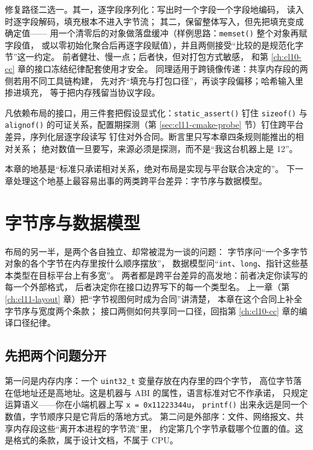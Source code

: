 \documentclass[12pt,a4paper,fontset=fandol]{ctexbook}
\newcommand{\Fn}[1]{\texttt{#1()}}
\newcommand{\Tp}[1]{\texttt{#1}}
\begin{document}
修复路径二选一。其一，逐字段序列化：写出时一个字段一个字段地编码，
读入时逐字段解码，填充根本不进入字节流；
其二，保留整体写入，但先把填充变成确定值——
用一个清零后的对象做落盘缓冲（样例思路：\Fn{memset} 整个对象再赋字段值，
或以零初始化聚合后再逐字段赋值），并且两侧接受“比较的是规范化字节”这一约定。
前者健壮、慢一点；后者快，但对打包方式敏感，
和第 \ref{ch:cl10-cc} 章的接口冻结纪律配套使用才安全。
同理适用于跨镜像传递：共享内存段的两侧若用不同工具链构建，
先对齐“填充与打包口径”，再谈字段偏移；哈希输入里掺进填充，
等于把内存残留当协议字段。

\begin{bestpractice}[title={把布局假设写进代码}]
凡依赖布局的接口，用三件套把假设显式化：\Fn{static\_assert} 钉住
\Fn{sizeof} 与 \Fn{alignof} 的可证关系，配置期探测（第
\ref{sec:cl11-cmake-probe} 节）钉住跨平台差异，序列化层逐字段读写
钉住对外合同。断言里只写本章四条规则能推出的相对关系；
绝对数值一旦要写，来源必须是探测，而不是“我这台机器上是 12”。
\end{bestpractice}

本章的地基是“标准只承诺相对关系，绝对布局是实现与平台联合决定的”。
下一章处理这个地基上最容易出事的两类跨平台差异：字节序与数据模型。

\chapter{字节序与数据模型}\label{ch:cl12-endian}

布局的另一半，是两个各自独立、却常被混为一谈的问题：
字节序问“一个多字节对象的各个字节在内存里按什么顺序摆放”，
数据模型问“\Tp{int}、\Tp{long}、指针这些基本类型在目标平台上有多宽”。
两者都是跨平台差异的高发地：前者决定你读写的每一个外部格式，
后者决定你在接口边界写下的每一个类型名。
上一章（第 \ref{ch:cl11-layout} 章）把“字节视图何时成为合同”讲清楚，
本章在这个合同上补全字节序与宽度两个条款；
接口两侧如何共享同一口径，回指第 \ref{ch:cl10-cc} 章的编译口径纪律。

\section{先把两个问题分开}\label{sec:cl12-two-questions}

第一问是内存内序：一个 \Tp{uint32\_t} 变量存放在内存里的四个字节，
高位字节落在低地址还是高地址。这是机器与 ABI 的属性，语言标准对它不作承诺，
只规定运算语义——你在小端机器上写 \Tp{x = 0x11223344u}，
\Fn{printf} 出来永远是同一个数值，字节顺序只是它背后的落地方式。
第二问是外部序：文件、网络报文、共享内存段这些“离开本进程的字节流”里，
约定第几个字节承载哪个位置的值。这是格式的条款，属于设计文档，不属于 CPU。
\end{document}
